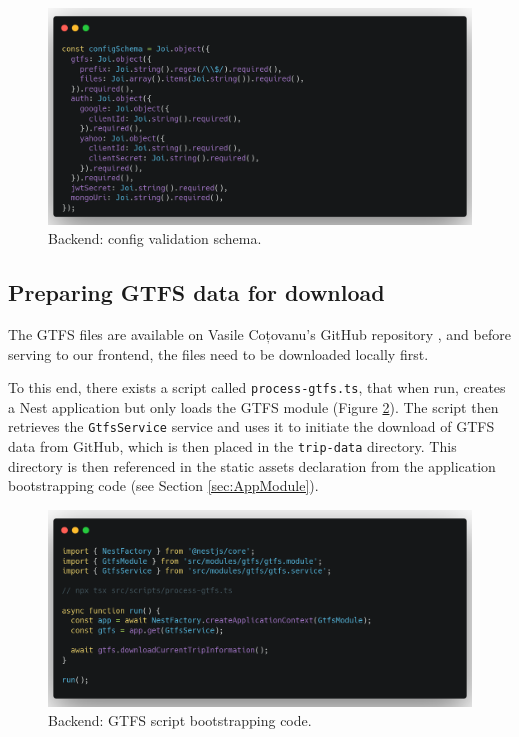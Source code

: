 \begin{figure}[htbp]
    \centering
    \includegraphics[width=1\textwidth]{./figures/code/be_config-schema.png}
    \caption{Backend: config validation schema.}
    \label{FigBeConfigSchema}
\end{figure}

\subsection{Preparing GTFS data for download}

The GTFS files are available on Vasile Coțovanu's GitHub repository \cite{VasileRubyExporter}, and before serving to our frontend, the files need to be downloaded locally first.

To this end, there exists a script called \verb|process-gtfs.ts|, that when run, creates a Nest application but only loads the GTFS module (Figure \ref{FigBeGTFSBootstrap}). The script then retrieves the \verb|GtfsService| service and uses it to initiate the download of GTFS data from GitHub, which is then placed in the \verb|trip-data| directory. This directory is then referenced in the static assets declaration from the application bootstrapping code (see Section \ref{sec:AppModule}).

\begin{figure}[htbp]
    \centering
    \includegraphics[width=1\textwidth]{./figures/code/be_gtfs-bootstrap.png}
    \caption{Backend: GTFS script bootstrapping code.}
    \label{FigBeGTFSBootstrap}
\end{figure}

